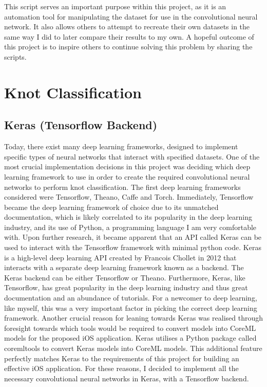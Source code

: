 \documentclass{l4proj}
\begin{document}
This script serves an important purpose within this project, as it is an automation tool for manipulating the dataset for use in the convolutional neural network.
It also allows others to attempt to recreate their own datasets in the same way I did to later compare their results to my own.
A hopeful outcome of this project is to inspire others to continue solving this problem by sharing the scripts. 

\section{Knot Classification}

\subsection{Keras (Tensorflow Backend)}
Today, there exist many deep learning frameworks, designed to implement specific types of neural networks that interact with specified datasets.
One of the most crucial implementation decisions in this project was deciding which deep learning framework to use in order to create the required convolutional neural networks to perform knot classification.
The first deep learning frameworks considered were Tensorflow\cite{45381}, Theano\cite{2016arXiv160502688short}, Caffe\cite{jia2014caffe} and Torch\cite{torch}.
Immediately, Tensorflow became the deep learning framework of choice due to its unmatched documentation, which is likely correlated to its popularity in the deep learning industry, and its use of Python, a programming language I am very comfortable with.
Upon further research, it became apparent that an API called Keras can be used to interact with the Tensorflow framework with minimal python code.
Keras is a high-level deep learning API created by Francois Chollet in 2012 \cite{chollet2015keras} that interacts with a separate deep learning framework known as a backend.
The Keras backend can be either Tensorflow or Theano.
Furthermore, Keras, like Tensorflow, has great popularity in the deep learning industry and thus great documentation and an abundance of tutorials.
For a newcomer to deep learning, like myself, this was a very important factor in picking the correct deep learning framework.
Another crucial reason for leaning towards Keras was realised through foresight towards which tools would be required to convert models into CoreML models for the proposed iOS application.
Keras utilises a Python package called coremltools to convert Keras models into CoreML models.
This additional feature perfectly matches Keras to the requirements of this project for building an effective iOS application. 
For these reasons, I decided to implement all the necessary convolutional neural networks in Keras, with a Tensorflow backend.
\end{document}
